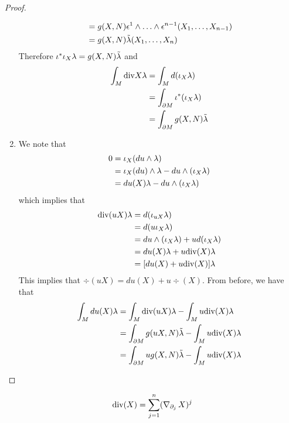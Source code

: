 \documentclass{book}
\begin{document}
\begin{proof}
\begin{enumerate}
\begin{align*}
			& = g(X,N) \epsilon^1 \wedge \ldots \wedge \epsilon^{n-1}(X_1, \ldots, X_{n-1}) \\
			& =  g(X, N) \tilde{\lambda}(X_1, \ldots, X_n) 
		\end{align*}
		Therefore $	\iota^* \iota_X \lambda  = g(X,N) \tilde{\lambda}$ and 
		\begin{align*}
			\int_M \text{div} X \lambda 
			& = \int_M d(\iota_X \lambda) \\
			& = \int_{\partial M} \iota^* (\iota_X \lambda) \\
			& = \int_{\partial M} g(X, N) \tilde{\lambda}
		\end{align*}
		\item We note that
		\begin{align*}
			0
			& = \iota_X(d u \wedge \lambda) \\
			& = \iota_X(du) \wedge \lambda - du \wedge (\iota_X \lambda) \\
			& = du(X) \lambda  - du \wedge (\iota_X \lambda) 
		\end{align*} 
		which implies that 
		\begin{align*}
			\text{div} (uX) \lambda 
			& = d(\iota_{uX} \lambda) \\
			& = d (u \iota_X \lambda) \\
			& = du \wedge (\iota_X \lambda) + u d(\iota_X \lambda ) \\
			& = du(X) \lambda + u \text{div}(X) \lambda \\
			& = [du(X) + u \text{div}(X)] \lambda 
		\end{align*}
		This implies that $	\div (uX) = du(X) + u \div(X)$. From before, we have that 
		\begin{align*}
			\int_M du(X) \lambda 
			& = \int_M \text{div} (uX) \lambda - \int_M u \text{div}(X) \lambda \\
			& = \int_{\partial M} g(uX, N) \tilde{\lambda} - \int_M u \text{div}(X) \lambda \\
			& = \int_{\partial M} u g(X, N) \tilde{\lambda} - \int_M u \text{div}(X) \lambda \\
		\end{align*}
	\end{enumerate}
\end{proof}


\begin{ex}
	$$\text{div}(X) = \sum_{j = 1}^n (\operatorname{\nabla}_{\partial_j} X)^j$$
\end{ex}
\end{document}
